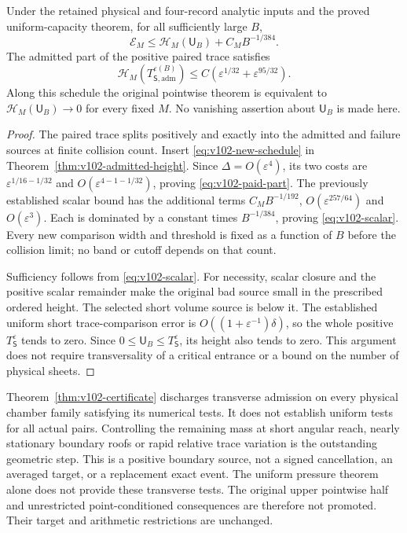 \begin{theorem}
\label{thm:v102-scalar}
Under the retained physical and four-record analytic inputs and the
proved uniform-capacity theorem, for all sufficiently large $B$,
\begin{equation}\label{eq:v102-scalar}
               \mathcal E_M\le\mathcal H_M(\mathsf U_B)
                                      +C_MB^{-1/384}.
\end{equation}
The admitted part of the positive paired trace satisfies
\begin{equation}\label{eq:v102-paid-part}
 \mathcal H_M(T_{\mathsf S,\mathrm{adm}}^{\varepsilon(B)})
                    \le C(\varepsilon^{1/32}
                                      +\varepsilon^{95/32}).
\end{equation}
Along this schedule the original pointwise theorem is equivalent
to $\mathcal H_M(\mathsf U_B)\to0$ for every fixed $M$.
No vanishing assertion about $\mathsf U_B$ is made here.
\end{theorem}
\begin{proof}
The paired trace splits positively and exactly into the admitted
and failure sources at finite collision count. Insert
\eqref{eq:v102-new-schedule} in
Theorem~\ref{thm:v102-admitted-height}. Since $\Delta=O(\varepsilon^4)$,
its two costs are $\varepsilon^{1/16-1/32}$ and
$O(\varepsilon^{4-1-1/32})$, proving
\eqref{eq:v102-paid-part}. The previously established scalar bound
has the additional terms
$C_MB^{-1/192}$, $O(\varepsilon^{257/64})$ and
$O(\varepsilon^3)$. Each is dominated by a constant times
$B^{-1/384}$, proving \eqref{eq:v102-scalar}. Every new comparison
width and threshold is fixed as a function of $B$ before the
collision limit; no band or cutoff depends on that count.

Sufficiency follows from \eqref{eq:v102-scalar}. For necessity,
scalar closure and the positive scalar remainder make the original
bad source small in the prescribed ordered height. The selected
short volume source is below it. The established uniform short
trace-comparison error is $O((1+\varepsilon^{-1})\delta)$, so the
whole positive $T_{\mathsf S}^\varepsilon$ tends to zero.
Since $0\le\mathsf U_B\le T_{\mathsf S}^\varepsilon$, its height
also tends to zero. This argument does not require transversality
of a critical entrance or a bound on the number of physical sheets.
\end{proof}

Theorem~\ref{thm:v102-certificate} discharges transverse admission
on every physical chamber family satisfying its numerical tests.
It does not establish uniform tests for all actual pairs. Controlling
the remaining mass at short angular reach, nearly stationary boundary
roofs or rapid relative trace variation is the outstanding geometric
step. This is a positive boundary source, not a signed cancellation,
an averaged target, or a replacement exact event. The uniform
pressure theorem alone does not provide these transverse tests.
The original upper pointwise half and unrestricted point-conditioned
consequences are therefore not promoted. Their target and arithmetic
restrictions are unchanged.
